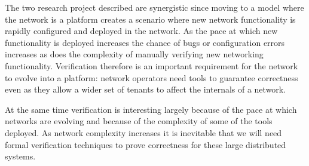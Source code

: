 \documentclass[letterpaper]{article}
\begin{document}
The two research project described are synergistic since moving to a model where the network is a platform
creates a scenario where new network functionality is rapidly configured and deployed in the network. As the
pace at which new functionality is deployed increases the chance of bugs or configuration errors increases as
does the complexity of manually verifying new networking functionality. Verification therefore is an important
requirement for the network to evolve into a platform: network operators need tools to guarantee correctness
even as they allow a wider set of tenants to affect the internals of a network.

At the same time verification is interesting largely because of the pace at which networks are evolving and
because of the complexity of some of the tools deployed. As network complexity increases it is inevitable that
we will need formal verification techniques to prove correctness for these large distributed systems. 




\end{document}

